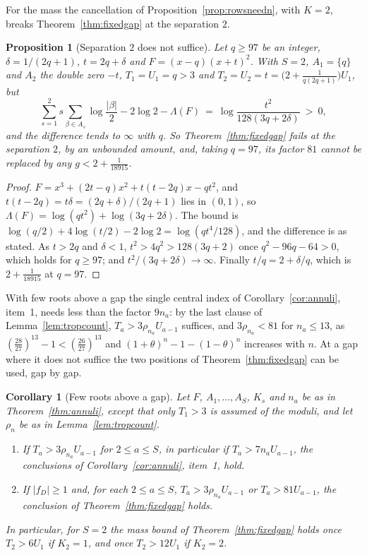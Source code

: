 \documentclass[11pt]{article}
\newtheorem{corollary}[theorem]{Corollary}
\newtheorem{proposition}[theorem]{Proposition}
\begin{document}
For the mass the cancellation of Proposition~\ref{prop:rowsneedn}, with $K=2$, breaks
Theorem~\ref{thm:fixedgap} at the separation $2$.

\begin{proposition}[Separation $2$ does not suffice]\label{prop:gaptwo}
Let $q\ge97$ be an integer, $\delta=1/(2q+1)$, $t=2q+\delta$ and
$F=(x-q)(x+t)^2$.  With $S=2$, $A_1=\{q\}$ and $A_2$ the double zero $-t$,
$T_1=U_1=q>3$ and $T_2=U_2=t=\bigl(2+\frac1{q(2q+1)}\bigr)U_1$, but
\[
  \sum_{s=1}^2s\sum_{\beta\in A_s}\log\frac{|\beta|}2-2\log2-\Lambda(F)
  \ =\ \log\frac{t^2}{128(3q+2\delta)}\ >\ 0 ,
\]
and the difference tends to $\infty$ with $q$.  So
Theorem~\ref{thm:fixedgap} fails at the separation $2$, by an unbounded
amount, and, taking $q=97$, its factor $81$ cannot be replaced by any
$g<2+\frac1{18915}$.
\end{proposition}

\begin{proof}
$F=x^3+(2t-q)x^2+t(t-2q)x-qt^2$, and $t(t-2q)=t\delta=(2q+\delta)/(2q+1)$
lies in $(0,1)$, so $\Lambda(F)=\log(qt^2)+\log(3q+2\delta)$.  The bound is
$\log(q/2)+4\log(t/2)-2\log2=\log(qt^4/128)$, and the difference is as
stated.  As $t>2q$ and $\delta<1$, $t^2>4q^2>128(3q+2)$ once
$q^2-96q-64>0$, which holds for $q\ge97$; and $t^2/(3q+2\delta)\to\infty$.
Finally $t/q=2+\delta/q$, which is $2+\frac1{18915}$ at $q=97$.
\end{proof}

With few roots above a gap the single central index of
Corollary~\ref{cor:annuli}, item~1, needs less than the factor $9n_a$: by
the last clause of Lemma~\ref{lem:tropcount}, $T_a>3\rho_{n_a}U_{a-1}$
suffices, and $3\rho_{n_a}<81$ for $n_a\le13$, as
$(\frac{28}{27})^{13}-1<(\frac{26}{27})^{13}$ and $(1+\theta)^n-1-(1-\theta)^n$
increases with $n$.  At a gap where it does not
suffice the two positions of Theorem~\ref{thm:fixedgap} can be used, gap by gap.

\begin{corollary}[Few roots above a gap]\label{cor:fewabove}
Let $F$, $A_1,\ldots,A_S$, $K_s$ and $n_a$ be as in
Theorem~\ref{thm:annuli}, except that only $T_1>3$ is assumed of the
moduli, and let $\rho_n$ be as in Lemma~\ref{lem:tropcount}.
\begin{enumerate}
\item If $T_a>3\rho_{n_a}U_{a-1}$ for $2\le a\le S$, in particular if
$T_a>7n_aU_{a-1}$, the conclusions of Corollary~\ref{cor:annuli}, item~1,
hold.
\item If $|f_D|\ge1$ and, for each $2\le a\le S$, $T_a>3\rho_{n_a}U_{a-1}$ or
$T_a>81U_{a-1}$, the conclusion of Theorem~\ref{thm:fixedgap} holds.
\end{enumerate}
In particular, for $S=2$ the mass bound of Theorem~\ref{thm:fixedgap} holds
once $T_2>6U_1$ if $K_2=1$, and once $T_2>12U_1$ if $K_2=2$.
\end{corollary}
\end{document}
